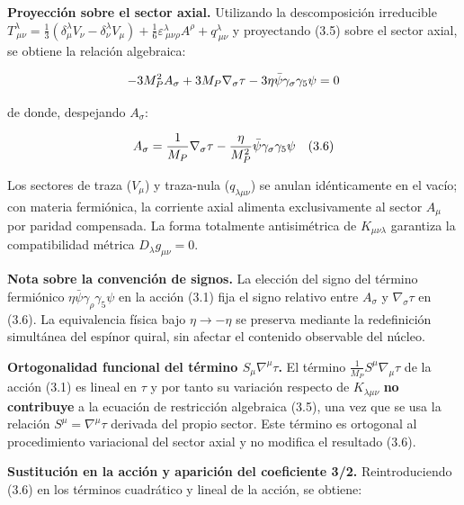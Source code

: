 ﻿\documentclass[11pt,letterpaper]{article}
\begin{document}
\textbf{Proyección sobre el sector axial.} Utilizando la descomposición irreducible $T^\lambda_{\ \mu\nu} = \frac{1}{3}(\delta^\lambda_\mu V_\nu - \delta^\lambda_\nu V_\mu) + \frac{1}{6}\varepsilon^\lambda_{\ \mu\nu\rho}A^\rho + q^\lambda_{\ \mu\nu}$ y proyectando (3.5) sobre el sector axial, se obtiene la relación algebraica:

\begin{equation*}
  \resizebox{\ifdim\width>\linewidth \linewidth\else\width\fi}{!}{$\displaystyle -3M_P^2 A_\sigma + 3M_P\nabla_\sigma\tau - 3\eta\bar{\psi}\gamma_\sigma\gamma_5\psi = 0$}
\end{equation*}

de donde, despejando $A_\sigma$:

\begin{equation*}
  \resizebox{\ifdim\width>\linewidth \linewidth\else\width\fi}{!}{$\displaystyle A_\sigma = \frac{1}{M_P}\nabla_\sigma\tau - \frac{\eta}{M_P^2}\bar{\psi}\gamma_\sigma\gamma_5\psi \quad (3.6)$}
\end{equation*}

Los sectores de traza ($V_\mu$) y traza-nula ($q_{\lambda\mu\nu}$) se anulan idénticamente en el vacío; con materia fermiónica, la corriente axial alimenta exclusivamente al sector $A_\mu$ por paridad compensada. La forma totalmente antisimétrica de $K_{\mu\nu\lambda}$ garantiza la compatibilidad métrica $D_\lambda g_{\mu\nu} = 0$.

\textbf{Nota sobre la convención de signos.} La elección del signo del término fermiónico $\eta\bar{\psi}\gamma_\rho\gamma_5\psi$ en la acción (3.1) fija el signo relativo entre $A_\sigma$ y $\nabla_\sigma\tau$ en (3.6). La equivalencia física bajo $\eta \to -\eta$ se preserva mediante la redefinición simultánea del espínor quiral, sin afectar el contenido observable del núcleo.

\textbf{Ortogonalidad funcional del término $S_\mu\nabla^\mu\tau$.} El término $\frac{1}{M_P}S^\mu\nabla_\mu\tau$ de la acción (3.1) es lineal en $\tau$ y por tanto su variación respecto de $K_{\lambda\mu\nu}$ \textbf{no contribuye} a la ecuación de restricción algebraica (3.5), una vez que se usa la relación $S^\mu = \nabla^\mu\tau$ derivada del propio sector. Este término es ortogonal al procedimiento variacional del sector axial y no modifica el resultado (3.6).

\textbf{Sustitución en la acción y aparición del coeficiente 3/2.} Reintroduciendo (3.6) en los términos cuadrático y lineal de la acción, se obtiene:
\end{document}
